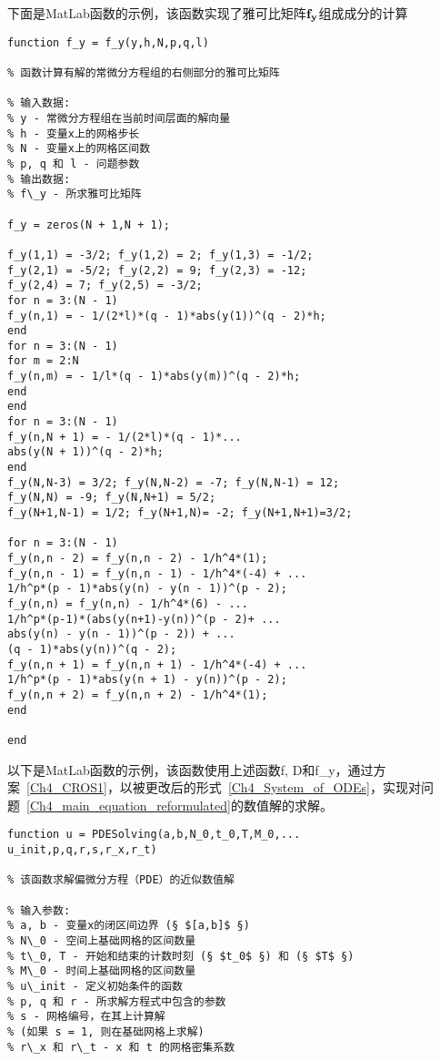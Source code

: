 \documentclass[twoside]{book}
\def\textbf{\bf}%
\begin{document}
\begin{CJK*}{GBK}{song}
下面是MatLab函数的示例，该函数实现了雅可比矩阵$\emph{\textbf{f}}_\emph{\textbf{y}}$组成成分的计算


%
\begin{lstlisting}
function f_y = f_y(y,h,N,p,q,l)

% 函数计算有解的常微分方程组的右侧部分的雅可比矩阵

% 输入数据:
% y - 常微分方程组在当前时间层面的解向量
% h - 变量x上的网格步长
% N - 变量x上的网格区间数
% p, q 和 l - 问题参数
% 输出数据:
% f\_y - 所求雅可比矩阵

f_y = zeros(N + 1,N + 1);

f_y(1,1) = -3/2; f_y(1,2) = 2; f_y(1,3) = -1/2;
f_y(2,1) = -5/2; f_y(2,2) = 9; f_y(2,3) = -12;
f_y(2,4) = 7; f_y(2,5) = -3/2;
for n = 3:(N - 1)
f_y(n,1) = - 1/(2*l)*(q - 1)*abs(y(1))^(q - 2)*h;
end
for n = 3:(N - 1)
for m = 2:N
f_y(n,m) = - 1/l*(q - 1)*abs(y(m))^(q - 2)*h;
end
end
for n = 3:(N - 1)
f_y(n,N + 1) = - 1/(2*l)*(q - 1)*...
abs(y(N + 1))^(q - 2)*h;
end
f_y(N,N-3) = 3/2; f_y(N,N-2) = -7; f_y(N,N-1) = 12;
f_y(N,N) = -9; f_y(N,N+1) = 5/2;
f_y(N+1,N-1) = 1/2; f_y(N+1,N)= -2; f_y(N+1,N+1)=3/2;

for n = 3:(N - 1)
f_y(n,n - 2) = f_y(n,n - 2) - 1/h^4*(1);
f_y(n,n - 1) = f_y(n,n - 1) - 1/h^4*(-4) + ...
1/h^p*(p - 1)*abs(y(n) - y(n - 1))^(p - 2);
f_y(n,n) = f_y(n,n) - 1/h^4*(6) - ...
1/h^p*(p-1)*(abs(y(n+1)-y(n))^(p - 2)+ ...
abs(y(n) - y(n - 1))^(p - 2)) + ...
(q - 1)*abs(y(n))^(q - 2);
f_y(n,n + 1) = f_y(n,n + 1) - 1/h^4*(-4) + ...
1/h^p*(p - 1)*abs(y(n + 1) - y(n))^(p - 2);
f_y(n,n + 2) = f_y(n,n + 2) - 1/h^4*(1);
end

end
\end{lstlisting}


以下是MatLab函数的示例，该函数使用上述函数f, D和f\_y，通过方案~\eqref{Ch4_CROS1}，以被更改后的形式~\eqref{Ch4_System_of_ODEs}，实现对问题~\eqref{Ch4_main_equation_reformulated}的数值解的求解。
%
\begin{lstlisting}
function u = PDESolving(a,b,N_0,t_0,T,M_0,...
u_init,p,q,r,s,r_x,r_t)

% 该函数求解偏微分方程（PDE）的近似数值解

% 输入参数:
% a, b - 变量x的闭区间边界 (§ $[a,b]$ §)
% N\_0 - 空间上基础网格的区间数量
% t\_0, T - 开始和结束的计数时刻 (§ $t_0$ §) 和 (§ $T$ §)
% M\_0 - 时间上基础网格的区间数量
% u\_init - 定义初始条件的函数
% p, q 和 r - 所求解方程式中包含的参数
% s - 网格编号，在其上计算解
% (如果 s = 1, 则在基础网格上求解)
% r\_x 和 r\_t - x 和 t 的网格密集系数


\end{lstlisting}
\end{CJK*}
\end{document}
